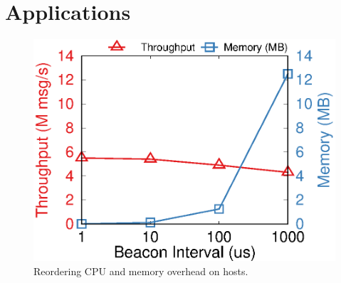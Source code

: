 \section{Applications}
\label{sec:application}


\begin{figure}[t!]
	\begin{minipage}{.31\textwidth}
    	\centering
		\includegraphics[width=\textwidth]{gnuplot/reorder_receiver.eps}
		\caption{Reordering CPU and memory overhead on hosts.}
		\label{fig:reorder-overhead}


\end{minipage}
\end{figure}
